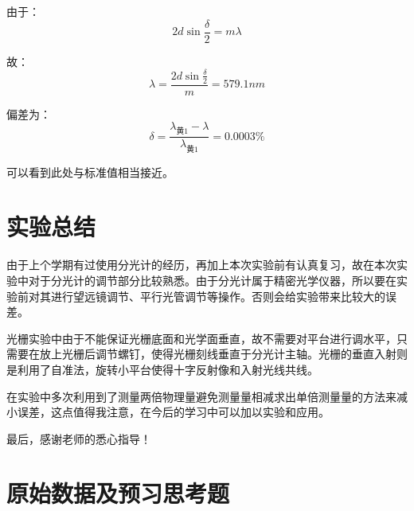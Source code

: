 \documentclass[UTF8]{ctexart}
\begin{document}
由于：
$$
2d\sin \frac{\delta}{2} = m\lambda
$$

故：
$$
 \lambda=\frac{2d\sin \frac{\delta}{2}}{m}=579.1 nm
$$

偏差为：
$$
\delta = \frac{\lambda_{\mbox{黄1}}-\lambda}{\lambda_{\mbox{黄1}}}=0.0003\%
$$

可以看到此处与标准值相当接近。


\section{实验总结}

由于上个学期有过使用分光计的经历，再加上本次实验前有认真复习，故在本次实验中对于分光计的调节部分比较熟悉。由于分光计属于精密光学仪器，所以要在实验前对其进行望远镜调节、平行光管调节等操作。否则会给实验带来比较大的误差。

光栅实验中由于不能保证光栅底面和光学面垂直，故不需要对平台进行调水平，只需要在放上光栅后调节螺钉，使得光栅刻线垂直于分光计主轴。光栅的垂直入射则是利用了自准法，旋转小平台使得十字反射像和入射光线共线。

在实验中多次利用到了测量两倍物理量避免测量量相减求出单倍测量量的方法来减小误差，这点值得我注意，在今后的学习中可以加以实验和应用。

最后，感谢老师的悉心指导！

\section{原始数据及预习思考题}
\end{document}
